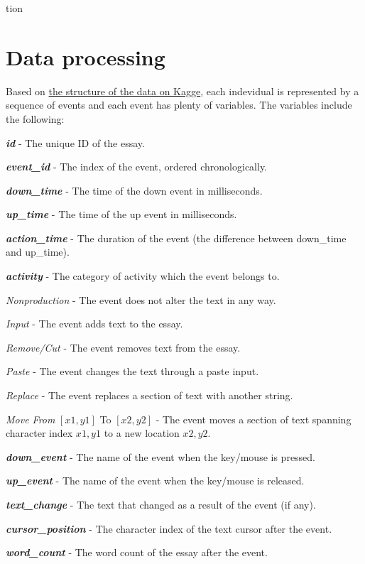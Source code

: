 tion\documentclass[8pt]{article}
\begin{document}
\section{Data processing}
Based on \href{https://www.kaggle.com/competitions/linking-writing-processes-to-writing-quality/data}{the structure of the data on Kagge}, each indevidual is represented by a sequence of events and each event has plenty of variables.
The variables include the following:
{
\small
\begin{compactitem}
    \item \textbf{\textit{id}} - The unique ID of the essay.
    \item \textbf{\textit{event\_id}} - The index of the event, ordered chronologically.
    \item \textbf{\textit{down\_time}} - The time of the down event in milliseconds.
    \item \textbf{\textit{up\_time}} - The time of the up event in milliseconds.
    \item \textbf{\textit{action\_time}} - The duration of the event (the difference between down\_time and up\_time).
    \item \textbf{\textit{activity}} - The category of activity which the event belongs to.
    \begin{compactitem}
        \item \textit{Nonproduction} - The event does not alter the text in any way.
        \item \textit{Input} - The event adds text to the essay.
        \item \textit{Remove/Cut} - The event removes text from the essay.
        \item \textit{Paste} - The event changes the text through a paste input.
        \item \textit{Replace} - The event replaces a section of text with another string.
        \item \textit{Move From} \([x1, y1]\) To \([x2, y2]\) - The event moves a section of text spanning character index \(x1, y1\) to a new location \(x2, y2\).
    \end{compactitem}
    \item \textbf{\textit{down\_event}} - The name of the event when the key/mouse is pressed.
    \item \textbf{\textit{up\_event}} - The name of the event when the key/mouse is released.
    \item \textbf{\textit{text\_change}} - The text that changed as a result of the event (if any).
    \item \textbf{\textit{cursor\_position}} - The character index of the text cursor after the event.
    \item \textbf{\textit{word\_count}} - The word count of the essay after the event.
\end{compactitem}
}
\end{document}
